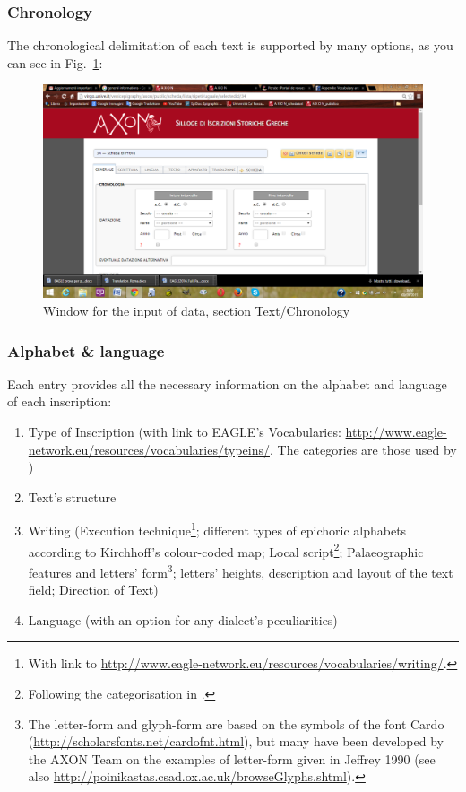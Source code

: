 \documentclass[amsthm,ebook]{saparticle}
\begin{document}
\subsubsection{Chronology}


\noindent The chronological delimitation of each text is supported by many options, as you can see in Fig.~\ref{fig:1}:

\begin{figure}[!bp]
\centering
 \includegraphics[width=\columnwidth]{EAGLE2016FullPaperrevised-img001.png}
\caption{Window for the input of data, section Text/Chronology}
\label{fig:1}
\end{figure}




\subsubsection{Alphabet \& language}





\noindent Each entry provides all the necessary information on the alphabet and language of each inscription:

\begin{enumerate}
\item Type of Inscription (with link to EAGLE’s Vocabularies:
\url{http://www.eagle-network.eu/resources/vocabularies/typeins/}. The categories are those used by \citet{guarducci_epigrafia_1987})
\item Text’s structure
\item Writing (Execution technique\footnote{ With link to \url{http://www.eagle-network.eu/resources/vocabularies/writing/}.};
different types of epichoric alphabets according to Kirchhoff’s colour-coded map; Local script\footnote{ Following the
categorisation in \citet{jeffery_local_1990}.}; Palaeographic features and letters’ form\footnote{ The letter-form and glyph-form are
based on the symbols of the font Cardo (\url{http://scholarsfonts.net/cardofnt.html}), but many have been developed by the
AXON Team on the examples of letter-form given in Jeffrey 1990 (see also
\url{http://poinikastas.csad.ox.ac.uk/browseGlyphs.shtml}).}; letters’ heights, description and layout of the text field;
Direction of Text)
\item Language (with an option for any dialect’s peculiarities)
\end{enumerate}
\end{document}
